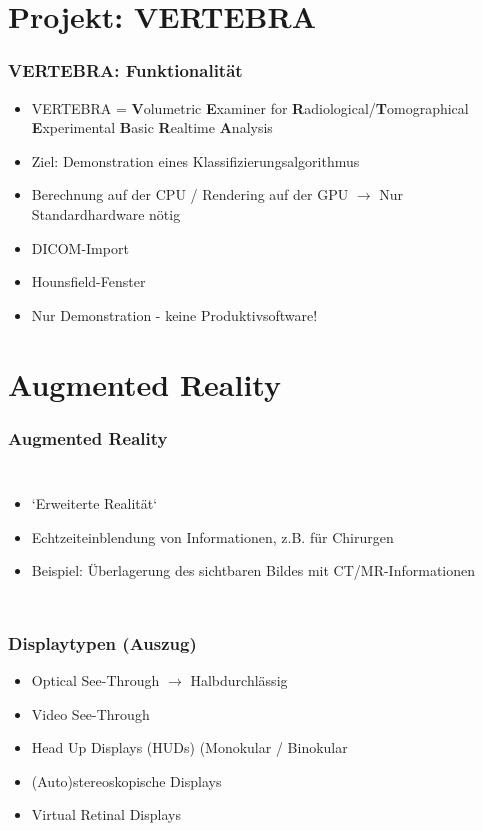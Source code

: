 \documentclass[14pt]{beamer}
\begin{document}
\section{Projekt: VERTEBRA}
\begin{frame}
\frametitle{VERTEBRA: Funktionalität}
\begin{itemize}
 \item VERTEBRA = \textbf{V}olumetric \textbf{E}xaminer for \textbf{R}adiological/\textbf{T}omographical \textbf{E}xperimental \textbf{B}asic \textbf{R}ealtime \textbf{A}nalysis
 \item Ziel: Demonstration eines Klassifizierungsalgorithmus
 \item Berechnung auf der CPU / Rendering auf der GPU $\rightarrow$ Nur Standardhardware nötig
 \item DICOM-Import
 \item Hounsfield-Fenster
 \item Nur Demonstration - keine Produktivsoftware!
\end{itemize}
\end{frame}
%
%
\section{Augmented Reality}
\begin{frame}[allowframebreaks]
\frametitle{Augmented Reality}
\begin{columns}
	    \begin{itemize}
	    \item `Erweiterte Realität`
	    \item Echtzeiteinblendung von Informationen, z.B. für Chirurgen
	    \item Beispiel: Überlagerung des sichtbaren Bildes mit CT/MR-Informationen
	    \end{itemize}
\end{columns}
\end{frame}

\begin{frame}
\frametitle{Displaytypen (Auszug)}
\begin{itemize}
 \item Optical See-Through $\rightarrow$ Halbdurchlässig
 \item Video See-Through
 \item Head Up Displays (HUDs) (Monokular / Binokular
 \item (Auto)stereoskopische Displays
 \item Virtual Retinal Displays
\end{itemize}
\end{frame}
%
%
\end{document}
